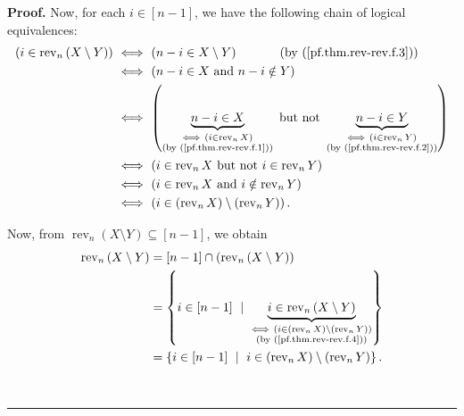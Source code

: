 \documentclass[numbers=enddot,12pt,final,onecolumn,notitlepage]{scrartcl}%
\theoremstyle{definition}
\newenvironment{proof}[1][Proof]{\noindent\textbf{#1.} }{\ \rule{0.5em}{0.5em}}
\begin{document}
\begin{proof}
Now, for each $i\in\left[  n-1\right]  $, we have the following chain of
logical equivalences:%
\begin{align}
\left(  i\in\operatorname*{rev}\nolimits_{n}\left(  X\setminus Y\right)
\right)  \  &  \Longleftrightarrow\ \left(  n-i\in X\setminus Y\right)
\ \ \ \ \ \ \ \ \ \ \left(  \text{by (\ref{pf.thm.rev-rev.f.3})}\right)
\nonumber\\
&  \Longleftrightarrow\ \left(  n-i\in X\text{ and }n-i\notin Y\right)
\nonumber\\
&  \Longleftrightarrow\ \left(  \underbrace{n-i\in X}%
_{\substack{\Longleftrightarrow\ \left(  i\in\operatorname*{rev}%
\nolimits_{n}X\right)  \\\text{(by (\ref{pf.thm.rev-rev.f.1}))}}}\text{ but
not }\underbrace{n-i\in Y}_{\substack{\Longleftrightarrow\ \left(
i\in\operatorname*{rev}\nolimits_{n}Y\right)  \\\text{(by
(\ref{pf.thm.rev-rev.f.2}))}}}\right) \nonumber\\
&  \Longleftrightarrow\ \left(  i\in\operatorname*{rev}\nolimits_{n}X\text{
but not }i\in\operatorname*{rev}\nolimits_{n}Y\right) \nonumber\\
&  \Longleftrightarrow\ \left(  i\in\operatorname*{rev}\nolimits_{n}X\text{
and }i\notin\operatorname*{rev}\nolimits_{n}Y\right) \nonumber\\
&  \Longleftrightarrow\ \left(  i\in\left(  \operatorname*{rev}\nolimits_{n}%
X\right)  \setminus\left(  \operatorname*{rev}\nolimits_{n}Y\right)  \right)
. \label{pf.thm.rev-rev.f.4}%
\end{align}


Now, from $\operatorname*{rev}\nolimits_{n}\left(  X\setminus Y\right)
\subseteq\left[  n-1\right]  $, we obtain%
\begin{align}
\operatorname*{rev}\nolimits_{n}\left(  X\setminus Y\right)   &  =\left[
n-1\right]  \cap\left(  \operatorname*{rev}\nolimits_{n}\left(  X\setminus
Y\right)  \right) \nonumber\\
&  =\left\{  i\in\left[  n-1\right]  \ \mid\ \underbrace{i\in
\operatorname*{rev}\nolimits_{n}\left(  X\setminus Y\right)  }%
_{\substack{\Longleftrightarrow\ \left(  i\in\left(  \operatorname*{rev}%
\nolimits_{n}X\right)  \setminus\left(  \operatorname*{rev}\nolimits_{n}%
Y\right)  \right)  \\\text{(by (\ref{pf.thm.rev-rev.f.4}))}}}\right\}
\nonumber\\
&  =\left\{  i\in\left[  n-1\right]  \ \mid\ i\in\left(  \operatorname*{rev}%
\nolimits_{n}X\right)  \setminus\left(  \operatorname*{rev}\nolimits_{n}%
Y\right)  \right\}  . \label{pf.thm.rev-rev.f.5}%
\end{align}



\end{proof}
\end{document}
